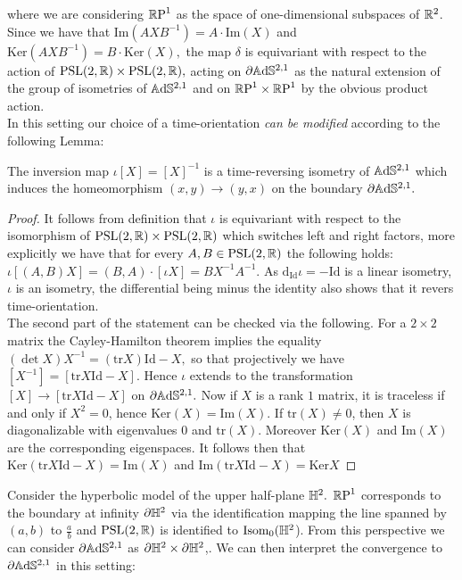where we are considering $\mathbb{R}\text{P}^1$ as the space of one-dimensional subspaces of $\mathbb{R}^2$. Since we have that $\text{Im}(AXB^{-1})=A\cdot\text{Im}(X)$ and $\text{Ker} (AXB^{-1})=B\cdot\text{Ker}(X),$ the map $\delta$ is equivariant with respect to the action of $\text{PSL}(2,\mathbb{R})\times\text{PSL}(2,\mathbb{R}),$ acting on $\partial\mathbb{A}\mathrm{d}\mathbb{S}^{2,1}$ as the natural extension of the group of isometries of $\mathbb{A}\mathrm{d}\mathbb{S}^{2,1}$ and on $\mathbb{R}\text{P}^1\times\mathbb{R}\text{P}^1$ by the obvious product action.\\
In this setting our choice of a time-orientation \textit{can be modified} according to the following Lemma:
\begin{lemma}\label{invertime}
    The inversion map $\iota[X]=[X]^{-1}$ is a time-reversing isometry of $\mathbb{A}\mathrm{d}\mathbb{S}^{2,1}$ which induces the homeomorphism $(x,y)\to(y,x)$ on the boundary $\partial\mathbb{A}\mathrm{d}\mathbb{S}^{2,1}.$
\end{lemma}
\begin{proof}
    It follows from definition that $\iota$ is equivariant with respect to the isomorphism of $\text{PSL}(2,\mathbb{R})\times\text{PSL}(2,\mathbb{R})$ which switches left and right factors, more explicitly we have that for every $A,B\in\text{PSL}(2,\mathbb{R})$ the following holds: $\iota[(A,B)X]=(B,A)\cdot[\iota X]=BX^{-1}A^{-1}$. As $\text{d}_\text{Id}\iota=-\text{Id}$ is a linear isometry, $\iota$ is an isometry, the differential being minus the identity also shows that it revers time-orientation. \\ 
    The second part of the statement can be checked via the following. For a $2\times2$ matrix the Cayley-Hamilton theorem implies the equality $(\det X)X^{-1}=(\text{tr}X)\text{Id}-X,$ so that projectively we have $[X^{-1}]=[\text{tr}X\text{Id}-X].$ Hence $\iota$ extends to the transformation $[X]\to[\text{tr}X\text{Id}-X]$ on $\partial\mathbb{A}\mathrm{d}\mathbb{S}^{2,1}.$ Now if $X$ is a rank $1$ matrix, it is traceless if and only if $X^2=0$, hence $\text{Ker}(X)=\text{Im}(X).$ If $\text{tr}(X)\neq 0$, then $X$ is diagonalizable with eigenvalues $0$ and $\text{tr}(X)$. Moreover $\text{Ker}(X)$ and $\text{Im}(X)$ are the corresponding eigenspaces. It follows then that $\text{Ker}(\text{tr}X\text{Id}-X)=\text{Im}(X)$ and $\text{Im}(\text{tr}X\text{Id}-X)=\text{Ker}X$ 
\end{proof}


Consider the hyperbolic model of the upper half-plane $\mathbb{H}^2.$ $\mathbb{R}\text{P}^1$ corresponds to the boundary at infinity $\partial\mathbb{H}^2$ via the identification mapping the line spanned by $(a,b)$ to $\frac{a}{b}$ and $\text{PSL}(2,\mathbb{R})$ is identified to $\text{Isom}_0(\mathbb{H}^2$). From this perspective we can consider $\partial\mathbb{A}\mathrm{d}\mathbb{S}^{2,1}$ as $\partial\mathbb{H}^2\times\partial\mathbb{H}^2$,. We can then interpret the convergence to $\partial\mathbb{A}\mathrm{d}\mathbb{S}^{2,1}$ in this setting:

